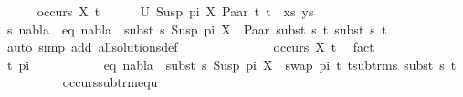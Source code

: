 \begin{isabellebody}
\isanewline
\isanewline
\ \ \ \ \isakeywordONE{{\isacharbraceleft}{\kern0pt}}\isamarkupfalse%
\isamarkupfalse%
\ {\isachardoublequoteopen}occurs\ X\ t{}{\isachardoublequoteclose}\isanewline
\ \ \ \ \isakeywordONE{{\isacharbraceleft}{\kern0pt}}\isamarkupfalse%
\isamarkupfalse%
\ {\isachardoublequoteopen}U\ {\isacharparenleft}{\kern0pt}{\isacharparenleft}{\kern0pt}Susp\ pi\ X{\isacharcomma}{\kern0pt}\ Paar\ t{}\ t{}{\isacharparenright}{\kern0pt}\ {\isacharhash}{\kern0pt}\ xs{\isacharcomma}{\kern0pt}\ ys{\isacharparenright}{\kern0pt}\ {\isasymnoteq}\ {\isacharbraceleft}{\kern0pt}{\isacharbraceright}{\kern0pt}{\isachardoublequoteclose}\isanewline
\ \ \ \ \ \ \isamarkupfalse%
\ \isamarkupfalse%
\ s\ nabla\ \ eq{}{\isacharcolon}{\kern0pt}\ {\isachardoublequoteopen}nabla\ {\isasymturnstile}\ subst\ s\ {\isacharparenleft}{\kern0pt}Susp\ pi\ X{\isacharparenright}{\kern0pt}\ {\isasymapprox}\ Paar\ {\isacharparenleft}{\kern0pt}subst\ s\ t{}{\isacharparenright}{\kern0pt}\ {\isacharparenleft}{\kern0pt}subst\ s\ t{}{\isacharparenright}{\kern0pt}{\isachardoublequoteclose}\isanewline
\ \ \ \ \ \ \ \ \isamarkupfalse%
\ {\isacharparenleft}{\kern0pt}auto\ simp\ add{\isacharcolon}{\kern0pt}\ all{\isacharunderscore}{\kern0pt}solutions{\isacharunderscore}{\kern0pt}def{\isacharparenright}{\kern0pt}\isanewline
\ \ \ \ \ \ \isamarkupfalse%
\isanewline
\ \ \ \ \ \ \isamarkupfalse%
\ {\isachardoublequoteopen}occurs\ X\ t{}{\isachardoublequoteclose}\ \isamarkupfalse%
\ fact\isanewline
\ \ \ \ \ \ \isamarkupfalse%
\ \isamarkupfalse%
\ t{\isacharprime}{\kern0pt}\ pi{\isacharprime}{\kern0pt}\ \ \ \isanewline
\ \ \ \ \ \ \ \ eq{}{\isacharcolon}{\kern0pt}\ {\isachardoublequoteopen}nabla\ {\isasymturnstile}\ subst\ s\ {\isacharparenleft}{\kern0pt}Susp\ pi\ X{\isacharparenright}{\kern0pt}\ {\isasymapprox}\ swap\ pi{\isacharprime}{\kern0pt}\ t{\isacharprime}{\kern0pt}{\isachardoublequoteclose}\ {\isachardoublequoteopen}t{\isacharprime}{\kern0pt}{\isasymin}sub{\isacharunderscore}{\kern0pt}trms\ {\isacharparenleft}{\kern0pt}subst\ s\ t{}{\isacharparenright}{\kern0pt}{\isachardoublequoteclose}\isanewline
\ \ \ \ \ \ \ \ \isamarkupfalse%
\ occurs{\isacharunderscore}{\kern0pt}sub{\isacharunderscore}{\kern0pt}trm{\isacharunderscore}{\kern0pt}equ\ \isamarkupfalse%

\end{isabellebody}
